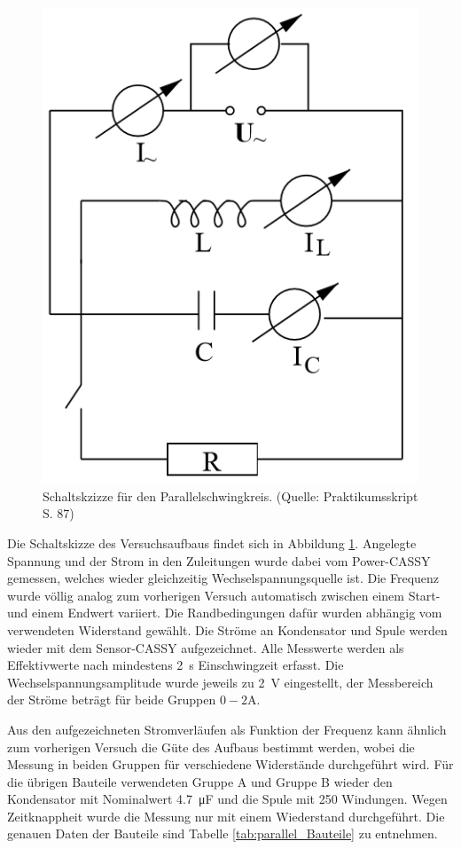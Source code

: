\documentclass[12pt,a4paper]{article}
\begin{document}
\begin{figure}
\centering
\includegraphics[scale=0.8]{Bilder/AufbauParallel.png}
\caption{Schaltskzizze für den Parallelschwingkreis. (Quelle: Praktikumsskript S. 87)}
\label{fig:AufbauParallel}
\end{figure}

Die Schaltskizze des Versuchsaufbaus findet sich in Abbildung \ref{fig:AufbauParallel}. Angelegte Spannung und der Strom in den Zuleitungen wurde dabei vom Power-CASSY gemessen, welches wieder gleichzeitig Wechselspannungsquelle ist. Die Frequenz wurde völlig analog zum vorherigen Versuch automatisch zwischen einem Start- und einem Endwert variiert. Die Randbedingungen dafür wurden abhängig vom verwendeten Widerstand gewählt. 
Die Ströme an Kondensator und Spule werden wieder mit dem Sensor-CASSY aufgezeichnet. Alle Messwerte werden als Effektivwerte nach mindestens \SI{2}{\s} Einschwingzeit erfasst.
Die Wechselspannungsamplitude wurde jeweils zu \SI{2}{\V} eingestellt, der Messbereich der Ströme beträgt für beide Gruppen $0-2$A.

Aus den aufgezeichneten Stromverläufen als Funktion der Frequenz kann ähnlich zum vorherigen Versuch die Güte des Aufbaus bestimmt werden, wobei die Messung in beiden Gruppen für verschiedene Widerstände durchgeführt wird. Für die übrigen Bauteile verwendeten Gruppe A und  Gruppe B wieder den Kondensator mit Nominalwert \SI{4,7}{\micro \F} und die Spule mit 250 Windungen.
Wegen Zeitknappheit wurde die Messung nur mit einem Wiederstand durchgeführt. Die genauen Daten der Bauteile sind Tabelle \ref{tab:parallel_Bauteile} zu entnehmen.
\end{document}
